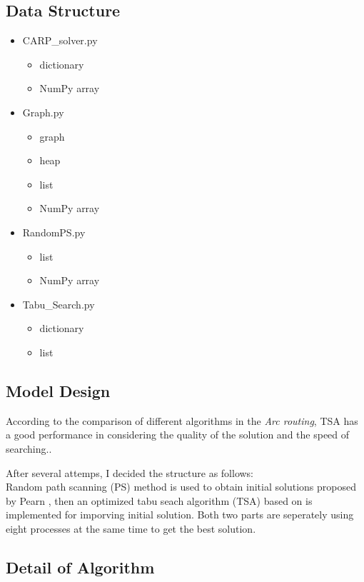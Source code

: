 \documentclass[conference,compsoc]{IEEEtran}
\begin{document}
\subsection{Data Structure}
\begin{itemize}
	\item CARP\_solver.py
	\begin{itemize}
		\item dictionary
		\item NumPy array		
	\end{itemize}
	\item Graph.py
	\begin{itemize}	
		\item graph
		\item heap
		\item list
		\item NumPy array		
	\end{itemize}
	\item RandomPS.py
	\begin{itemize}
		\item list
		\item NumPy array
	\end{itemize}
	\item Tabu\_Search.py
	\begin{itemize}
		\item dictionary
		\item list
	\end{itemize}
\end{itemize}


\subsection{Model Design}
According to the comparison of different algorithms in the \textit{Arc routing}, TSA has a good performance in considering the quality of the solution and the speed of searching.\cite{Eiselt}. 
\par After several attemps, I decided the structure as follows:\\
 Random path scanning (PS) method is used to obtain initial solutions proposed by Pearn \cite{Pearn}, then an optimized tabu seach algorithm (TSA) based on \cite{Brandao} is implemented for imporving initial solution. Both two parts are seperately using eight processes at the same time to get the best solution.


\subsection{Detail of Algorithm}
\end{document}
